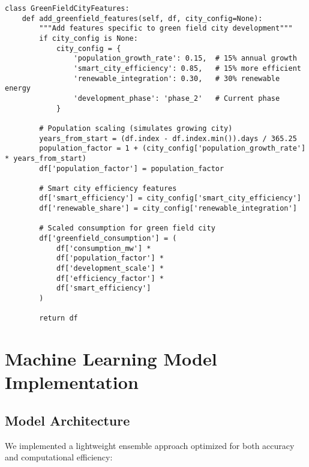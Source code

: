 \documentclass[12pt,a4paper]{article}
\begin{document}
\begin{lstlisting}[caption={Green Field City Feature Engineering}]
class GreenFieldCityFeatures:
    def add_greenfield_features(self, df, city_config=None):
        """Add features specific to green field city development"""
        if city_config is None:
            city_config = {
                'population_growth_rate': 0.15,  # 15% annual growth
                'smart_city_efficiency': 0.85,   # 15% more efficient
                'renewable_integration': 0.30,   # 30% renewable energy
                'development_phase': 'phase_2'   # Current phase
            }
        
        # Population scaling (simulates growing city)
        years_from_start = (df.index - df.index.min()).days / 365.25
        population_factor = 1 + (city_config['population_growth_rate'] * years_from_start)
        df['population_factor'] = population_factor
        
        # Smart city efficiency features
        df['smart_efficiency'] = city_config['smart_city_efficiency']
        df['renewable_share'] = city_config['renewable_integration']
        
        # Scaled consumption for green field city
        df['greenfield_consumption'] = (
            df['consumption_mw'] * 
            df['population_factor'] * 
            df['development_scale'] * 
            df['efficiency_factor'] * 
            df['smart_efficiency']
        )
        
        return df
\end{lstlisting}

\section{Machine Learning Model Implementation}

\subsection{Model Architecture}
We implemented a lightweight ensemble approach optimized for both accuracy and computational efficiency:
\end{document}
